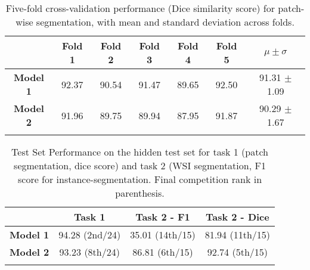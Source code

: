 \begin{table}[!t]
\renewcommand{\arraystretch}{1.5}
\setlength\tabcolsep{3.50pt}
 {\bf  
\begin{center}
\caption{Five-fold cross-validation performance (Dice similarity score) for patch-wise segmentation, with mean and standard deviation across folds.}\label{table_1}
\begin{tabular}{c cccccc}
\midrule
                       &  Fold 1 &  Fold 2  &  Fold 3  &  Fold 4 &  Fold 5 &  $\mu\pm\sigma$ \\
\midrule
\textbf{Model 1}       & 92.37 & 90.54 & 91.47    & 89.65 & 92.50 & 91.31 $\pm$ 1.09       \\
\midrule
\textbf{Model 2}       & 91.96 & 89.75 & 89.94    & 87.95 & 91.87 & 90.29 $\pm$ 1.67   \\
\bottomrule
\\[-0.25cm]
\end{tabular}
% 
\end{center}
}
\vspace{-0.5cm}
\end{table} 


\begin{table}[!b]
\renewcommand{\arraystretch}{1.5}
\setlength\tabcolsep{3.50pt}
 {\bf  
\begin{center}
\caption{Test Set Performance on the hidden test set for task 1 (patch segmentation, dice score) and task 2 (WSI segmentation, F1 score for instance-segmentation. Final competition rank in parenthesis.}\label{table_2}
\begin{tabular}{c ccc}
\midrule
                       &  \textbf{Task 1} & \textbf{Task 2 - F1} & \textbf{Task 2 - Dice}   \\
\midrule
\textbf{Model 1}       & 94.28 (2nd/24)   & 35.01 (14th/15) & 81.94 (11th/15)  \\
\midrule
\textbf{Model 2}       & 93.23 (8th/24)   & 86.81 (6th/15)  & 92.74 (5th/15)\\
\bottomrule
\\[-0.25cm]
\end{tabular}

\end{center}
}
\vspace{-0.5cm}
\end{table} 


